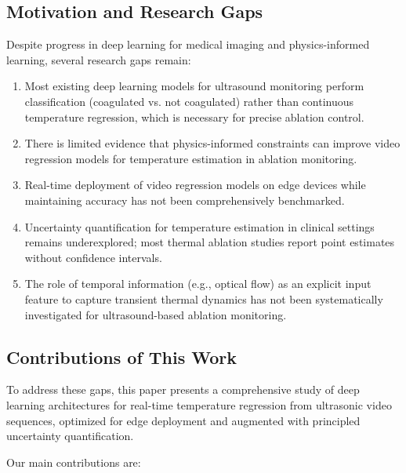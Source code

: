 \subsection{Motivation and Research Gaps}

Despite progress in deep learning for medical imaging and physics-informed learning, several research gaps remain:

\begin{enumerate}
    \item Most existing deep learning models for ultrasound monitoring perform classification (coagulated vs. not coagulated) rather than continuous temperature regression, which is necessary for precise ablation control.

    \item There is limited evidence that physics-informed constraints can improve video regression models for temperature estimation in ablation monitoring.

    \item Real-time deployment of video regression models on edge devices while maintaining accuracy has not been comprehensively benchmarked.

    \item Uncertainty quantification for temperature estimation in clinical settings remains underexplored; most thermal ablation studies report point estimates without confidence intervals.

    \item The role of temporal information (e.g., optical flow) as an explicit input feature to capture transient thermal dynamics has not been systematically investigated for ultrasound-based ablation monitoring.
\end{enumerate}

\subsection{Contributions of This Work}

To address these gaps, this paper presents a comprehensive study of deep learning architectures for real-time temperature regression from ultrasonic video sequences, optimized for edge deployment and augmented with principled uncertainty quantification.

Our main contributions are:

